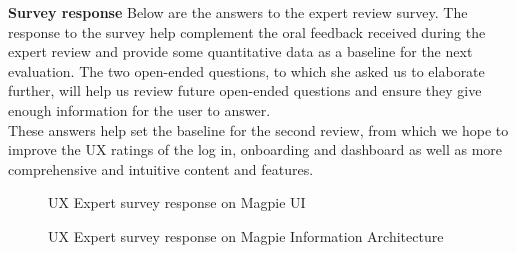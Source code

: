 \textbf{Survey response}
Below are the answers to the expert review survey. The response to the survey help complement the oral feedback received during the expert review and provide some quantitative data as a baseline for the next evaluation. The two open-ended questions, to which she asked us to elaborate further, will help us review future open-ended questions and ensure they give enough information for the user to answer.\\
These answers help set the baseline for the second review, from which we hope to improve the UX ratings of the log in, onboarding and dashboard as well as more comprehensive and intuitive content and features.\\
\begin{figure}
    \centering
    \caption{UX Expert survey response on Magpie UI}
\end{figure}
\begin{figure}
    \centering
    \caption{UX Expert survey response on Magpie Information Architecture}
\end{figure}
